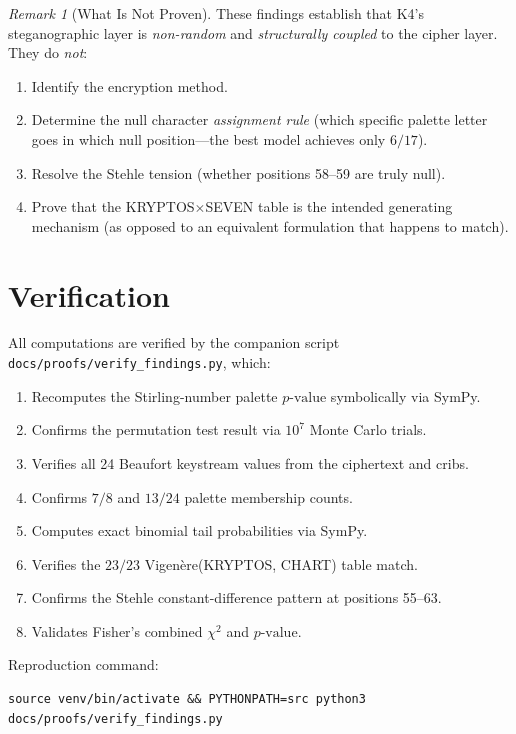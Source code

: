 \documentclass[11pt]{article}
\theoremstyle{plain}
\theoremstyle{definition}
\theoremstyle{remark}
\newtheorem{remark}[theorem]{Remark}
\newcommand{\pvalue}{p\text{-value}}
\begin{document}
\begin{remark}[What Is Not Proven]
\label{rem:not-proven}
These findings establish that K4's steganographic layer is \emph{non-random} and \emph{structurally coupled} to the cipher layer. They do \emph{not}:
\begin{enumerate}\item Identify the encryption method.
\item Determine the null character \emph{assignment rule} (which specific palette letter goes in which null position---the best model achieves only $6/17$).
\item Resolve the Stehle tension (whether positions 58--59 are truly null).
\item Prove that the KRYPTOS$\times$SEVEN table is the intended generating mechanism (as opposed to an equivalent formulation that happens to match).
\end{enumerate}
\end{remark}

\section{Verification}

All computations are verified by the companion script \texttt{docs/proofs/verify\_findings.py}, which:
\begin{enumerate}\item Recomputes the Stirling-number palette $\pvalue$ symbolically via SymPy.
\item Confirms the permutation test result via $10^7$ Monte Carlo trials.
\item Verifies all 24 Beaufort keystream values from the ciphertext and cribs.
\item Confirms $7/8$ and $13/24$ palette membership counts.
\item Computes exact binomial tail probabilities via SymPy.
\item Verifies the $23/23$ Vigen\`{e}re(KRYPTOS, CHART) table match.
\item Confirms the Stehle constant-difference pattern at positions 55--63.
\item Validates Fisher's combined $\chi^2$ and $\pvalue$.
\end{enumerate}

Reproduction command:
\begin{verbatim}
source venv/bin/activate && PYTHONPATH=src python3 docs/proofs/verify_findings.py
\end{verbatim}
\end{document}
